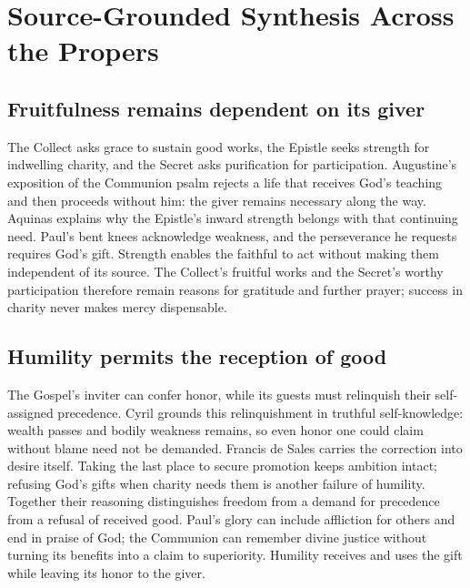 \sectionguard\section*{Source-Grounded Synthesis Across the Propers}
\subsection*{Fruitfulness remains dependent on its giver}
The Collect asks grace to sustain good works, the Epistle seeks strength for indwelling charity, and the Secret asks purification for participation. Augustine's exposition of the Communion psalm rejects a life that receives God's teaching and then proceeds without him: the giver remains necessary along the way. Aquinas explains why the Epistle's inward strength belongs with that continuing need. Paul's bent knees acknowledge weakness, and the perseverance he requests requires God's gift. Strength enables the faithful to act without making them independent of its source. The Collect's fruitful works and the Secret's worthy participation therefore remain reasons for gratitude and further prayer; success in charity never makes mercy dispensable. 

\subsection*{Humility permits the reception of good}
The Gospel's inviter can confer honor, while its guests must relinquish their self-assigned precedence. Cyril grounds this relinquishment in truthful self-knowledge: wealth passes and bodily weakness remains, so even honor one could claim without blame need not be demanded. Francis de Sales carries the correction into desire itself. Taking the last place to secure promotion keeps ambition intact; refusing God's gifts when charity needs them is another failure of humility. Together their reasoning distinguishes freedom from a demand for precedence from a refusal of received good. Paul's glory can include affliction for others and end in praise of God; the Communion can remember divine justice without turning its benefits into a claim to superiority. Humility receives and uses the gift while leaving its honor to the giver. 

